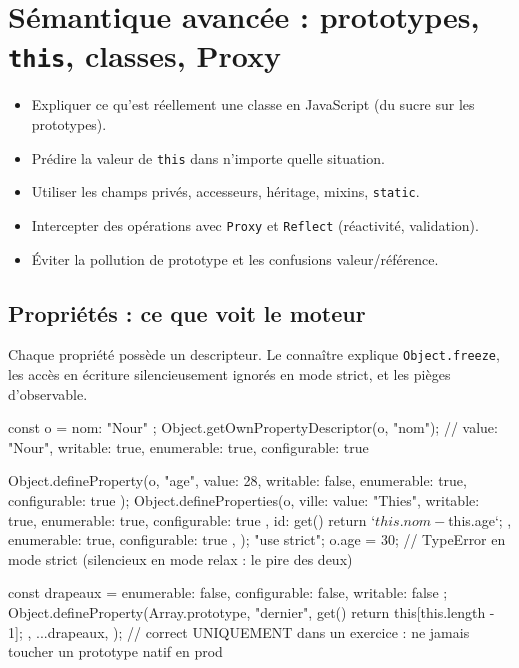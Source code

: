 \chapter{S\'emantique avanc\'ee : prototypes, \texttt{this}, classes, Proxy}
\label{ch-js-avance}

\begin{objectif}
\begin{itemize}
  \item Expliquer ce qu'est r\'eellement une classe en JavaScript (du sucre sur les prototypes).
  \item Pr\'edire la valeur de \texttt{this} dans n'importe quelle situation.
  \item Utiliser les champs priv\'es, accesseurs, h\'eritage, mixins, \texttt{static}.
  \item Intercepter des op\'erations avec \texttt{Proxy} et \texttt{Reflect} (r\'eactivit\'e, validation).
  \item \'Eviter la pollution de prototype et les confusions valeur/r\'ef\'erence.
\end{itemize}
\end{objectif}

\section{Propri\'et\'es : ce que voit le moteur}

Chaque propri\'et\'e poss\`ede un descripteur. Le conna\^itre explique \texttt{Object.freeze},
les acc\`es en \'ecriture silencieusement ignor\'es en mode strict, et les pi\`eges d'observable.

\begin{codejs}
const o = { nom: "Nour" };
Object.getOwnPropertyDescriptor(o, "nom");
// { value: "Nour", writable: true, enumerable: true, configurable: true }

Object.defineProperty(o, "age", { value: 28, writable: false, enumerable: true, configurable: true });
Object.defineProperties(o, {
  ville: { value: "Thies", writable: true, enumerable: true, configurable: true },
  id: { get() { return `${this.nom}-${this.age}`; }, enumerable: true, configurable: true },
});
"use strict";
o.age = 30;          // TypeError en mode strict (silencieux en mode relax : le pire des deux)

const drapeaux = { enumerable: false, configurable: false, writable: false };
Object.defineProperty(Array.prototype, "dernier", {
  get() { return this[this.length - 1]; },
  ...drapeaux,
});   // correct UNIQUEMENT dans un exercice : ne jamais toucher un prototype natif en prod
\end{codejs}

